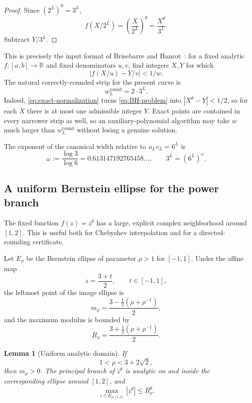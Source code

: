 \documentclass[11pt,oneside]{article}
\newtheorem{lemma}[theorem]{Lemma}
\theoremstyle{definition}
\theoremstyle{remark}
\newcommand{\R}{\mathbb R}
\newcommand{\tht}{\theta}
\begin{document}
\begin{proof}
Since $(2^L)^\tht=3^L$,
\[
  f(X/2^L)=\left(\frac{X}{2^L}\right)^\tht
  =\frac{X^\tht}{3^L}.
\]
Subtract $Y/3^L$.
\end{proof}

This is precisely the input format of Brisebarre and Hanrot~\cite{BrisebarreHanrot2026}: for a fixed
analytic $f:[a,b]\to\R$ and fixed denominators $u,v$, find integers $X,Y$ for which
\begin{equation}
  \left|f(X/u)-Y/v\right|<1/w.
  \label{eq:BH-problem}
\end{equation}
The natural correctly-rounded strip for the present curve is
\begin{equation}
  w_L^{\mathrm{round}}=2\cdot3^L.
  \label{eq:canonical-width}
\end{equation}
Indeed, \eqref{eq:exact-normalization} turns \eqref{eq:BH-problem} into
$|X^\tht-Y|<1/2$, so for each $X$ there is at most one admissible integer $Y$.  Exact points are
contained in every narrower strip as well, so an auxiliary-polynomial algorithm may take $w$ much
larger than $w_L^{\mathrm{round}}$ without losing a genuine solution.

The exponent of the canonical width relative to $u_Lv_L=6^L$ is
\begin{equation}
  \omega:=\frac{\log 3}{\log 6}=0.613147192765458\ldots,
  \qquad 3^L=(6^L)^\omega.
  \label{eq:omega}
\end{equation}

\subsection{A uniform Bernstein ellipse for the power branch}

The fixed function $f(z)=z^\tht$ has a large, explicit complex neighborhood around $[1,2]$.
This is useful both for Chebyshev interpolation and for a directed-rounding certificate.

Let $E_\rho$ be the Bernstein ellipse of parameter $\rho>1$ for $[-1,1]$.  Under the affine map
\[
  z=\frac{3+t}{2},\qquad t\in[-1,1],
\]
the leftmost point of the image ellipse is
\[
  m_\rho=\frac{3-\tfrac12(\rho+\rho^{-1})}{2},
\]
and the maximum modulus is bounded by
\[
  R_\rho=\frac{3+\tfrac12(\rho+\rho^{-1})}{2}.
\]

\begin{lemma}[Uniform analytic domain]
\label{lem:ellipse}
If
\begin{equation}
  1<\rho<3+2\sqrt2,
  \label{eq:rho-range}
\end{equation}
then $m_\rho>0$.  The principal branch of $z^\tht$ is analytic on and inside the corresponding
ellipse around $[1,2]$, and
\begin{equation}
  \max_{z\in E_{\rho,[1,2]}}|z^\tht|\le R_\rho^\tht.
  \label{eq:ellipse-norm}
\end{equation}
\end{lemma}
\end{document}
